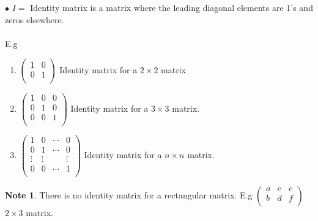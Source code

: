 \documentclass[11pt,a4paper]{article}
\theoremstyle{definition}
\newtheorem{note}[thm]{Note}
\begin{document}
$\bullet $ $I =$ Identity matrix is a matrix where the leading diagonal elements are 1's and zeros elsewhere.\\\\ 
E.g
\begin{enumerate}

\item[] $
\begin{pmatrix}
1&0\\
0&1\\
\end{pmatrix}
$ Identity matrix for a $2\times 2$ matrix\\

\item[]
$
\begin{pmatrix}
1 & 0 & 0\\
0 & 1 & 0\\
0 & 0 & 1\\
\end{pmatrix}
$ Identity matrix for a $3\times 3$ matrix.\\

\item[]
$
\begin{pmatrix}
1 & 0 & \cdots & 0\\
0 & 1 & \cdots & 0\\
\vdots & \vdots && \vdots \\
0 & 0 & \cdots & 1\\
\end{pmatrix}
$ Identity matrix for a $n\times n$ matrix.\\
\end{enumerate}

\begin{note}
 There is no identity matrix for a  rectangular matrix. E.g 
$
\begin{pmatrix}
a & c & e\\
b & d & f\\
\end{pmatrix}
$ $2\times 3$ matrix.
\end{note}
\end{document}
